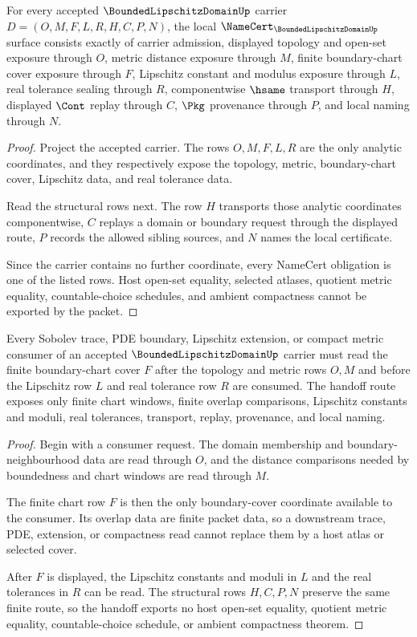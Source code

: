 \begin{theorem}
\label{thm:bounded-lipschitz-domain-namecert-obligations}
For every accepted $\BoundedLipschitzDomainUp$ carrier $D=(O,M,F,L,R,H,C,P,N)$, the local $\NameCert_{\BoundedLipschitzDomainUp}$ surface consists exactly of carrier admission, displayed topology and open-set exposure through $O$, metric distance exposure through $M$, finite boundary-chart cover exposure through $F$, Lipschitz constant and modulus exposure through $L$, real tolerance sealing through $R$, componentwise $\hsame$ transport through $H$, displayed $\Cont$ replay through $C$, $\Pkg$ provenance through $P$, and local naming through $N$.
\end{theorem}
\begin{proof}
Project the accepted carrier. The rows $O,M,F,L,R$ are the only analytic coordinates, and they respectively expose the topology, metric, boundary-chart cover, Lipschitz data, and real tolerance data.

Read the structural rows next. The row $H$ transports those analytic coordinates componentwise, $C$ replays a domain or boundary request through the displayed route, $P$ records the allowed sibling sources, and $N$ names the local certificate.

Since the carrier contains no further coordinate, every NameCert obligation is one of the listed rows. Host open-set equality, selected atlases, quotient metric equality, countable-choice schedules, and ambient compactness cannot be exported by the packet.
\end{proof}

\begin{theorem}
\label{thm:bounded-lipschitz-domain-finite-chart-handoff}
Every Sobolev trace, PDE boundary, Lipschitz extension, or compact metric consumer of an accepted $\BoundedLipschitzDomainUp$ carrier must read the finite boundary-chart cover $F$ after the topology and metric rows $O,M$ and before the Lipschitz row $L$ and real tolerance row $R$ are consumed. The handoff route exposes only finite chart windows, finite overlap comparisons, Lipschitz constants and moduli, real tolerances, transport, replay, provenance, and local naming.
\end{theorem}
\begin{proof}
Begin with a consumer request. The domain membership and boundary-neighbourhood data are read through $O$, and the distance comparisons needed by boundedness and chart windows are read through $M$.

The finite chart row $F$ is then the only boundary-cover coordinate available to the consumer. Its overlap data are finite packet data, so a downstream trace, PDE, extension, or compactness read cannot replace them by a host atlas or selected cover.

After $F$ is displayed, the Lipschitz constants and moduli in $L$ and the real tolerances in $R$ can be read. The structural rows $H,C,P,N$ preserve the same finite route, so the handoff exports no host open-set equality, quotient metric equality, countable-choice schedule, or ambient compactness theorem.
\end{proof}

